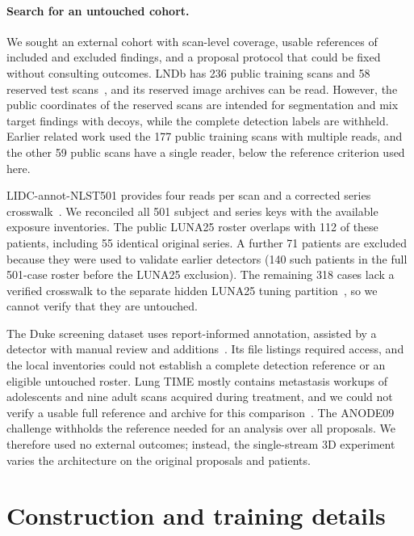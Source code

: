 \paragraph{Search for an untouched cohort.}
We sought an external cohort with scan-level coverage, usable references of included and excluded findings, and a proposal protocol that could be fixed without consulting outcomes. LNDb has 236 public training scans and 58 reserved test scans~\cite{pedrosa2021lndb}, and its reserved image archives can be read. However, the public coordinates of the reserved scans are intended for segmentation and mix target findings with decoys, while the complete detection labels are withheld. Earlier related work used the 177 public training scans with multiple reads, and the other 59 public scans have a single reader, below the reference criterion used here.

LIDC-annot-NLST501 provides four reads per scan and a corrected series crosswalk~\cite{nlst501reference}. We reconciled all 501 subject and series keys with the available exposure inventories. The public LUNA25 roster overlaps with 112 of these patients, including 55 identical original series. A further 71 patients are excluded because they were used to validate earlier detectors (140 such patients in the full 501-case roster before the LUNA25 exclusion). The remaining 318 cases lack a verified crosswalk to the separate hidden LUNA25 tuning partition~\cite{peeters2025protocol}, so we cannot verify that they are untouched.

The Duke screening dataset uses report-informed annotation, assisted by a detector with manual review and additions~\cite{wang2025duke}. Its file listings required access, and the local inventories could not establish a complete detection reference or an eligible untouched roster. Lung TIME mostly contains metastasis workups of adolescents and nine adult scans acquired during treatment, and we could not verify a usable full reference and archive for this comparison~\cite{dolejsi2009time}. The ANODE09 challenge withholds the reference needed for an analysis over all proposals. We therefore used no external outcomes; instead, the single-stream 3D experiment varies the architecture on the original proposals and patients.

\section{Construction and training details}
\label{supp:construction}


